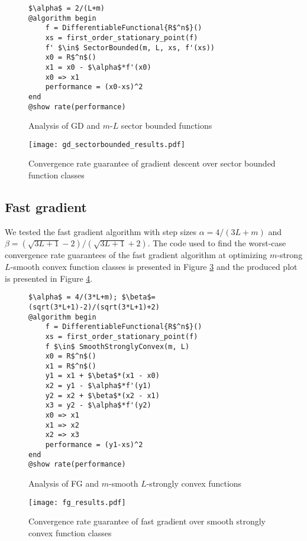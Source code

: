 \begin{figure}[h!]
	\begin{lstlisting}[mathescape]
$\alpha$ = 2/(L+m)
@algorithm begin
    f = DifferentiableFunctional{R$^n$}()
    xs = first_order_stationary_point(f)
    f' $\in$ SectorBounded(m, L, xs, f'(xs))
    x0 = R$^n$()
    x1 = x0 - $\alpha$*f'(x0)
    x0 => x1
    performance = (x0-xs)^2
end
@show rate(performance)
\end{lstlisting}
\caption{Analysis of GD and $m$-$L$ sector bounded functions}
\label{gd_sectorbounded_code}
\end{figure}

\begin{figure}[h]
    \centering
    \texttt{[image: gd\_sectorbounded\_results.pdf]}
    \caption{Convergence rate guarantee of gradient descent over sector bounded function classes}
    \label{gd_sectorbounded_results}
\end{figure}
\subsection*{Fast gradient}

We tested the fast gradient algorithm with step sizes $\alpha = 4/(3L + m)$ and $\beta = (\sqrt{3L + 1} - 2)/(\sqrt{3L + 1} + 2)$. The code used to find the worst-case convergence rate guarantees of the fast gradient algorithm at optimizing $m$-strong $L$-smooth convex function classes is presented in Figure \ref*{fg_code} and the produced plot is presented in Figure \ref*{fg_results}.

\begin{figure}[h!]
	\begin{lstlisting}[mathescape]
$\alpha$ = 4/(3*L+m); $\beta$=(sqrt(3*L+1)-2)/(sqrt(3*L+1)+2)
@algorithm begin
    f = DifferentiableFunctional{R$^n$}()
    xs = first_order_stationary_point(f)
    f $\in$ SmoothStronglyConvex(m, L)
    x0 = R$^n$()
    x1 = R$^n$()
    y1 = x1 + $\beta$*(x1 - x0)
    x2 = y1 - $\alpha$*f'(y1)
    y2 = x2 + $\beta$*(x2 - x1)
    x3 = y2 - $\alpha$*f'(y2)
    x0 => x1
    x1 => x2
    x2 => x3
    performance = (y1-xs)^2
end
@show rate(performance)
\end{lstlisting}
\caption{Analysis of FG and $m$-smooth $L$-strongly convex functions}
\label{fg_code}
\end{figure}

\begin{figure}[h]
    \centering
    \texttt{[image: fg\_results.pdf]}
    \caption{Convergence rate guarantee of fast gradient over smooth strongly convex function classes}
    \label{fg_results}
\end{figure}

